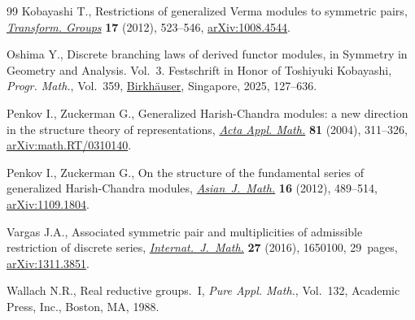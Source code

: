 \documentclass[11pt]{article}
\numberwithin{equation}{section}
\numberwithin{equation}{section}
\theoremstyle{definition}
\begin{document}
\begin{thebibliography}{99}
Kobayashi T., Restrictions of generalized {V}erma modules to symmetric pairs,
 \href{https://doi.org/10.1007/s00031-012-9180-y}{\textit{Transform. Groups}}
 \textbf{17} (2012), 523--546,
 \href{http://arxiv.org/abs/1008.4544}{arXiv:1008.4544}.

Oshima Y., Discrete branching laws of derived functor modules, in Symmetry in
 Geometry and Analysis. {V}ol.~3. {F}estschrift in Honor of {T}oshiyuki
 {K}obayashi, \textit{Progr. Math.}, Vol.~359,
 \href{https://doi.org/10.1007/978-981-97-7666-5_5}{Birkh\"auser}, Singapore,
 2025, 127--636.

Penkov I., Zuckerman G., Generalized {H}arish-{C}handra modules: a new
 direction in the structure theory of representations,
 \href{https://doi.org/10.1023/B:ACAP.0000024204.22996.2c}{\textit{Acta Appl.
 Math.}} \textbf{81} (2004), 311--326,
 \href{http://arxiv.org/abs/math.RT/0310140}{arXiv:math.RT/0310140}.

Penkov I., Zuckerman G., On the structure of the fundamental series of
 generalized {H}arish-{C}handra modules,
 \href{https://doi.org/10.4310/AJM.2012.v16.n3.a8}{\textit{Asian~J.~Math.}}
 \textbf{16} (2012), 489--514,
 \href{http://arxiv.org/abs/1109.1804}{arXiv:1109.1804}.

Vargas J.A., Associated symmetric pair and multiplicities of admissible
 restriction of discrete series,
 \href{https://doi.org/10.1142/S0129167X16501007}{\textit{Internat.~J.~Math.}}
 \textbf{27} (2016), 1650100, 29~pages,
 \href{http://arxiv.org/abs/1311.3851}{arXiv:1311.3851}.

Wallach N.R., Real reductive groups.~{I}, \textit{Pure Appl. Math.}, Vol.~132,
 Academic Press, Inc., Boston, MA, 1988.

\end{thebibliography}
\end{document}
